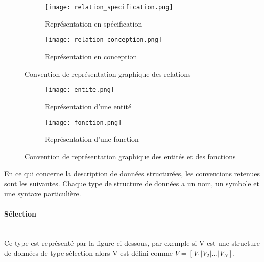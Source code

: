 \vspace{-1cm}

\begin{figure}[H]
    \centering
    \begin{subfigure}[b]{0.4\textwidth}
        \texttt{[image: relation\_specification.png]}
        \caption{Représentation en spécification}
        \label{fig:relation_specification}
    \end{subfigure}
    \begin{subfigure}[b]{0.4\textwidth}
        \texttt{[image: relation\_conception.png]}
        \caption{Représentation en conception}
        \label{fig:relation_conception}
    \end{subfigure}
    \caption{Convention de représentation graphique des relations}
    \label{fig:convention_representation_relation}
\end{figure}

\vspace{-1cm}

\begin{figure}[H]
    \centering
    \begin{subfigure}[b]{0.4\textwidth}
        \texttt{[image: entite.png]}
        \caption{Représentation d'une entité}
        \label{fig:convention_entite}
    \end{subfigure}
    \begin{subfigure}[b]{0.4\textwidth}
        \texttt{[image: fonction.png]}
        \caption{Représentation d'une fonction}
        \label{fig:convention_fonction}
    \end{subfigure}
    \caption{Convention de représentation graphique des entités et des fonctions}
    \label{fig:convention_representation_entite_fonction}
\end{figure}

\newpage

En ce qui concerne la description de données structurées, les conventions retenues sont les suivantes. Chaque type de structure de données a un nom, un symbole et une syntaxe particulière.

\paragraph{Sélection} ~~\\ \noindent
Ce type est représenté par la figure ci-dessous, par exemple si V est une structure de données de type sélection alors V est défini comme $V=[V_1|V_2|\ldots|V_N]$.

